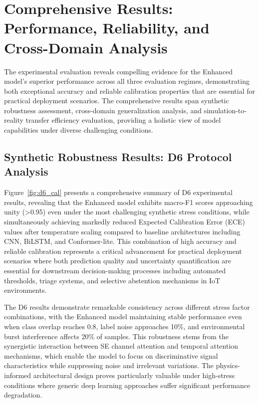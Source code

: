\documentclass[journal]{IEEEtran}
\begin{document}
\section{Comprehensive Results: Performance, Reliability, and Cross-Domain Analysis}

The experimental evaluation reveals compelling evidence for the Enhanced model's superior performance across all three evaluation regimes, demonstrating both exceptional accuracy and reliable calibration properties that are essential for practical deployment scenarios. The comprehensive results span synthetic robustness assessment, cross-domain generalization analysis, and simulation-to-reality transfer efficiency evaluation, providing a holistic view of model capabilities under diverse challenging conditions.

\subsection{Synthetic Robustness Results: D6 Protocol Analysis}

Figure~\ref{fig:d6_cal} presents a comprehensive summary of D6 experimental results, revealing that the Enhanced model exhibits macro-F1 scores approaching unity (>0.95) even under the most challenging synthetic stress conditions, while simultaneously achieving markedly reduced Expected Calibration Error (ECE) values after temperature scaling compared to baseline architectures including CNN, BiLSTM, and Conformer-lite. This combination of high accuracy and reliable calibration represents a critical advancement for practical deployment scenarios where both prediction quality and uncertainty quantification are essential for downstream decision-making processes including automated thresholds, triage systems, and selective abstention mechanisms in IoT environments.

The D6 results demonstrate remarkable consistency across different stress factor combinations, with the Enhanced model maintaining stable performance even when class overlap reaches 0.8, label noise approaches 10\%, and environmental burst interference affects 20\% of samples. This robustness stems from the synergistic interaction between SE channel attention and temporal attention mechanisms, which enable the model to focus on discriminative signal characteristics while suppressing noise and irrelevant variations. The physics-informed architectural design proves particularly valuable under high-stress conditions where generic deep learning approaches suffer significant performance degradation.
\end{document}
